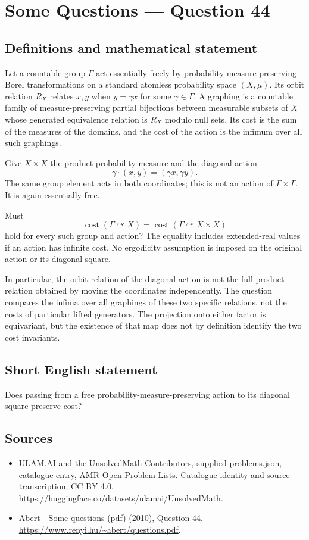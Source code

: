 \documentclass[11pt,a4paper]{article}
\begin{document}
\section*{Some Questions — Question 44}\label{statement}

\subsection{Definitions and mathematical statement}
Let a countable group $\Gamma$ act essentially freely by probability-measure-preserving Borel transformations on a standard atomless probability space $(X,\mu)$. Its orbit relation $R_X$ relates $x,y$ when $y=\gamma x$ for some $\gamma\in\Gamma$. A graphing is a countable family of measure-preserving partial bijections between measurable subsets of $X$ whose generated equivalence relation is $R_X$ modulo null sets. Its cost is the sum of the measures of the domains, and the cost of the action is the infimum over all such graphings.

Give $X\times X$ the product probability measure and the diagonal action
\[
 \gamma\cdot(x,y)=(\gamma x,\gamma y).
\]
The same group element acts in both coordinates; this is not an action of $\Gamma\times\Gamma$. It is again essentially free.

Must
\[
 \operatorname{cost}(\Gamma\curvearrowright X)
 =\operatorname{cost}(\Gamma\curvearrowright X\times X)
\]
hold for every such group and action? The equality includes extended-real values if an action has infinite cost. No ergodicity assumption is imposed on the original action or its diagonal square.

In particular, the orbit relation of the diagonal action is not the full product relation obtained by moving the coordinates independently. The question compares the infima over all graphings of these two specific relations, not the costs of particular lifted generators. The projection onto either factor is equivariant, but the existence of that map does not by definition identify the two cost invariants.
\subsection{Short English statement}
Does passing from a free probability-measure-preserving action to its diagonal square preserve cost?
\subsection{Sources}
\begin{itemize}
\item[S1] ULAM.AI and the UnsolvedMath Contributors, supplied problems.json, catalogue entry, AMR Open Problem Lists. Catalogue identity and source transcription; CC BY 4.0.
\url{https://huggingface.co/datasets/ulamai/UnsolvedMath}.
\item[S2] Abert - Some questions (pdf) (2010), Question 44. 
\url{https://www.renyi.hu/~abert/questions.pdf}.
\end{itemize}
\end{document}
